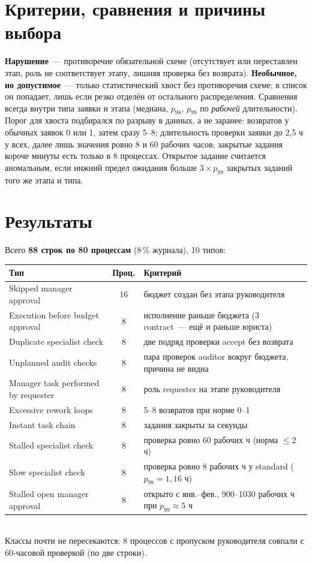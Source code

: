 \documentclass[10pt,a4paper]{article}
\begin{document}
\section{Критерии, сравнения и причины выбора}
\textbf{Нарушение}~--- противоречие обязательной схеме (отсутствует или переставлен этап, роль не соответствует этапу, лишняя проверка без возврата). \textbf{Необычное, но допустимое}~--- только статистический хвост без противоречия схеме; в список он попадает, лишь если резко отделён от остального распределения. Сравнения всегда внутри типа заявки и этапа (медиана, $p_{98}$, $p_{99}$ по \emph{рабочей} длительности). Порог для хвоста подбирался по разрыву в данных, а не заранее: возвратов у обычных заявок 0 или 1, затем сразу 5--8; длительность проверки заявки до 2,5 ч у всех, далее лишь значения ровно 8 и 60 рабочих часов; закрытые задания короче минуты есть только в 8 процессах. Открытое задание считается аномальным, если нижний предел ожидания больше $3\times p_{99}$ закрытых заданий того же этапа и типа.

\section{Результаты}
Всего \textbf{88 строк по 80 процессам} (8\,\% журнала), 10 типов:\\[2pt]
\begin{tabular}{@{}lcp{9.8cm}@{}}\toprule
Тип & Проц. & Критерий\\\midrule
Skipped manager approval & 16 & бюджет создан без этапа руководителя\\
Execution before budget approval & 8 & исполнение раньше бюджета (3 contract~--- ещё и раньше юриста)\\
Duplicate specialist check & 8 & две подряд проверки accept без возврата\\
Unplanned audit checks & 8 & пара проверок auditor вокруг бюджета, причина не видна\\
Manager task performed by requester & 8 & роль requester на этапе руководителя\\
Excessive rework loops & 8 & 5--8 возвратов при норме 0--1\\
Instant task chain & 8 & задания закрыты за секунды\\
Stalled specialist check & 8 & проверка ровно 60 рабочих ч (норма $\le$2 ч)\\
Slow specialist check & 8 & проверка ровно 8 рабочих ч у standard ($p_{98}=1{,}16$ ч)\\
Stalled open manager approval & 8 & открыто с янв.--фев., 900--1030 рабочих ч при $p_{99}\approx5$ ч\\\bottomrule
\end{tabular}\\[3pt]
Классы почти не пересекаются: 8 процессов с пропуском руководителя совпали с 60-часовой проверкой (по две строки).
\end{document}
